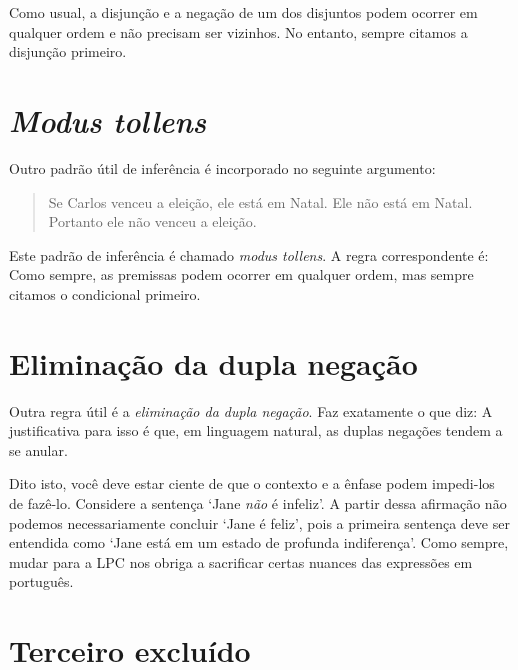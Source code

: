 Como usual, a disjunção e a negação de um dos disjuntos podem ocorrer em qualquer ordem e não precisam ser vizinhos. No entanto, sempre citamos a disjunção primeiro.

\section{\emph{Modus tollens}}
Outro padrão  útil de inferência é incorporado no seguinte argumento:
	\begin{quote}
		Se Carlos venceu a eleição, ele está em Natal. Ele não está em Natal. Portanto ele não venceu a eleição.
	\end{quote}
Este padrão de inferência é chamado \emph{modus tollens}. A regra correspondente é:
Como sempre, as premissas podem ocorrer em qualquer ordem, mas sempre citamos o condicional primeiro. 

\section{Eliminação da dupla negação}
Outra regra  útil é a  \emph{eliminação da dupla negação}. Faz exatamente o que diz:
A justificativa para isso é que, em linguagem natural, as duplas negações tendem a se anular.

Dito isto, você deve estar ciente de que o contexto e a ênfase podem impedi-los de fazê-lo. Considere a sentença `Jane \emph{não} é infeliz’.  A partir dessa afirmação  não podemos necessariamente concluir `Jane é feliz’, pois a primeira sentença deve ser entendida como  `Jane está em um estado de profunda indiferença’. 
  Como sempre, mudar para a LPC nos obriga a sacrificar certas nuances das expressões em português. 

\section{Terceiro excluído}

